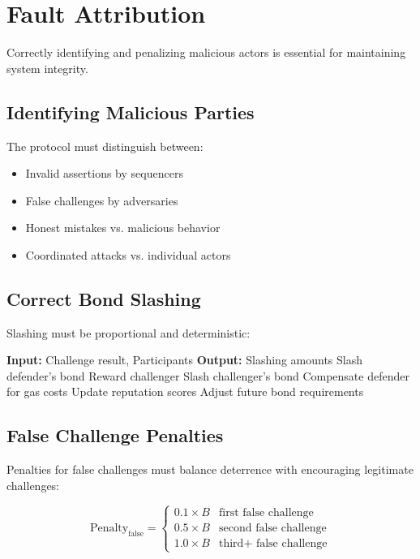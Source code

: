 \section{Fault Attribution}


Correctly identifying and penalizing malicious actors is essential for maintaining system integrity.

\subsection{Identifying Malicious Parties}

The protocol must distinguish between:
\begin{itemize}
    \item Invalid assertions by sequencers
    \item False challenges by adversaries
    \item Honest mistakes vs. malicious behavior
    \item Coordinated attacks vs. individual actors
\end{itemize}

\subsection{Correct Bond Slashing}

Slashing must be proportional and deterministic:

\begin{algorithm}
\caption{Bond Slashing Logic}
\begin{algorithmic}[1]
\State \textbf{Input:} Challenge result, Participants
\State \textbf{Output:} Slashing amounts
    \State Slash defender's bond
    \State Reward challenger
    \State Slash challenger's bond
    \State Compensate defender for gas costs
\EndIf
\State Update reputation scores
\State Adjust future bond requirements
\end{algorithmic}
\end{algorithm}

\subsection{False Challenge Penalties}

Penalties for false challenges must balance deterrence with encouraging legitimate challenges:

\begin{equation}
\text{Penalty}_{\text{false}} = \begin{cases}
0.1 \times B & \text{first false challenge} \\
0.5 \times B & \text{second false challenge} \\
1.0 \times B & \text{third+ false challenge}
\end{cases}
\end{equation}

